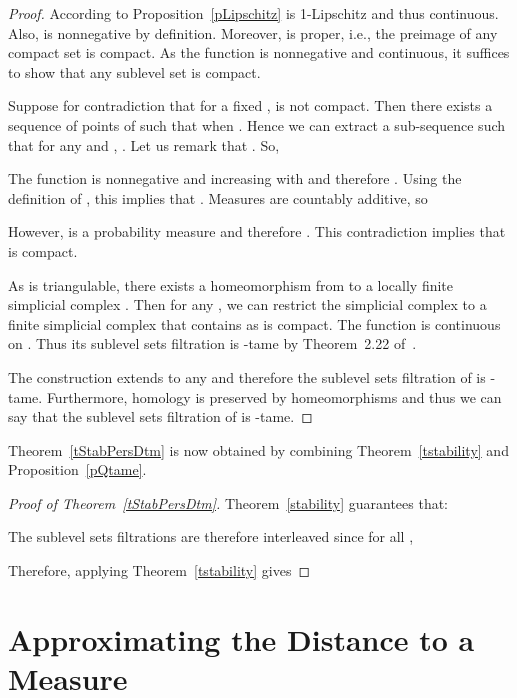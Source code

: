 \documentclass[a4paper]{article}
\begin{document}
\begin{proof}According to Proposition~\ref{pLipschitz}  is 1-Lipschitz and thus continuous. 
Also,  is nonnegative by definition.
Moreover,  is proper, i.e., the preimage of any compact set is compact. 
As the function is nonnegative and continuous, it suffices to show that any sublevel set  is compact.

Suppose for contradiction that for a fixed ,  is not compact.
Then there exists a sequence  of points of  such that  when .
Hence we can extract a sub-sequence  such that for any  and , .
Let us remark that .
So,

The function  is nonnegative and increasing with  and therefore .
Using the definition of , this implies that .
Measures are countably additive, so 

However,  is a probability measure and therefore .
This contradiction implies that  is compact.

As  is triangulable, there exists a homeomorphism  from  to a locally finite simplicial complex .
Then for any , we can restrict the simplicial complex  to a finite simplicial complex  that contains  as  is compact.
The function  is continuous on .
Thus its sublevel sets filtration is -tame by Theorem~2.22 of~\cite{sspmCDGO}.

The construction extends to any  and therefore the sublevel sets filtration of  is -tame.
Furthermore, homology is preserved by homeomorphisms and thus we can say that the sublevel sets filtration of  is -tame.
\end{proof}


Theorem~\ref{tStabPersDtm} is now obtained by combining Theorem~\ref{tstability} and Proposition~\ref{pQtame}.

\begin{proof}[Proof of Theorem~\ref{tStabPersDtm}]
Theorem~\ref{stability} guarantees that:

The sublevel sets filtrations are therefore interleaved since for all ,

Therefore, applying Theorem~\ref{tstability} gives

\end{proof}



\section{Approximating the Distance to a Measure} \label{sec:approximating_the_distance_to_a_measure}
\end{document}
